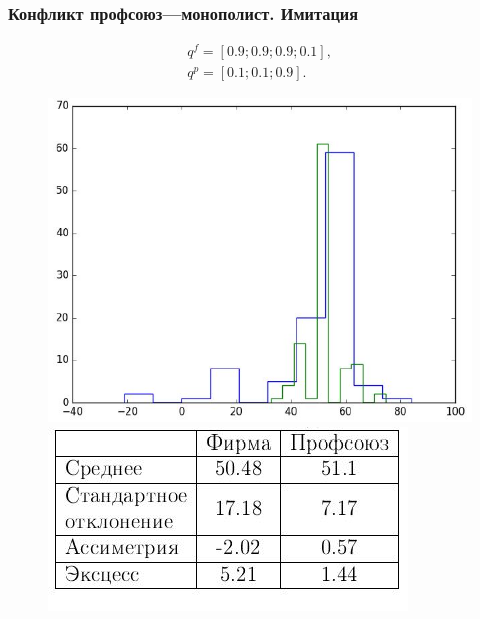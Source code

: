 \documentclass {beamer}
\begin{document}
\begin{frame}
\frametitle{Конфликт профсоюз---монополист. Имитация}
 \begin{gather*}
 q^f = \left[ 0.9; 0.9; 0.9; 0.1 \right], \\
 q^p = \left[ 0.1; 0.1; 0.9 \right].
 \end{gather*}
	\begin{figure}
		\begin{minipage}[b]{0.45\textwidth}
			
			\includegraphics[width=\textwidth]{firm2}
		\end{minipage}
		\begin{minipage}[b]{0.45\textwidth}
			
			\includegraphics[width=\textwidth]{firmtable2}
		\end{minipage}
		
	\end{figure}
\end{frame}
\end{document}
